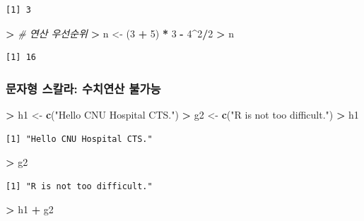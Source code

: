 \documentclass[11pt,a4paper]{book}
\newenvironment{Shaded}{\begin{snugshade}}{\end{snugshade}}
\newcommand{\KeywordTok}[1]{\textcolor[rgb]{0.13,0.29,0.53}{\textbf{#1}}}
\newcommand{\DecValTok}[1]{\textcolor[rgb]{0.00,0.00,0.81}{#1}}
\newcommand{\StringTok}[1]{\textcolor[rgb]{0.31,0.60,0.02}{#1}}
\newcommand{\CommentTok}[1]{\textcolor[rgb]{0.56,0.35,0.01}{\textit{#1}}}
\newcommand{\OperatorTok}[1]{\textcolor[rgb]{0.81,0.36,0.00}{\textbf{#1}}}
\newcommand{\ErrorTok}[1]{\textcolor[rgb]{0.64,0.00,0.00}{\textbf{#1}}}
\newcommand{\NormalTok}[1]{#1}
\theoremstyle{definition}
\theoremstyle{definition}
\theoremstyle{definition}
\theoremstyle{remark}
\begin{document}
\begin{verbatim}
[1] 3
\end{verbatim}

\begin{Shaded}
\begin{Highlighting}[]
\OperatorTok{>}\StringTok{ }\CommentTok{# 연산 우선순위}
\ErrorTok{>}\StringTok{ }\NormalTok{n <-}\StringTok{ }\NormalTok{(}\DecValTok{3} \OperatorTok{+}\StringTok{ }\DecValTok{5}\NormalTok{) }\OperatorTok{*}\StringTok{ }\DecValTok{3} \OperatorTok{-}\StringTok{ }\DecValTok{4}\OperatorTok{^}\DecValTok{2}\OperatorTok{/}\DecValTok{2}
\OperatorTok{>}\StringTok{ }\NormalTok{n}
\end{Highlighting}
\end{Shaded}

\begin{verbatim}
[1] 16
\end{verbatim}

\normalsize

\subsubsection{문자형 스칼라: 수치연산 불가능}\label{---}

\footnotesize

\begin{Shaded}
\begin{Highlighting}[]
\OperatorTok{>}\StringTok{ }\NormalTok{h1 <-}\StringTok{ }\KeywordTok{c}\NormalTok{(}\StringTok{"Hello CNU Hospital CTS."}\NormalTok{)}
\OperatorTok{>}\StringTok{ }\NormalTok{g2 <-}\StringTok{ }\KeywordTok{c}\NormalTok{(}\StringTok{"R is not too difficult."}\NormalTok{)}
\OperatorTok{>}\StringTok{ }\NormalTok{h1}
\end{Highlighting}
\end{Shaded}

\begin{verbatim}
[1] "Hello CNU Hospital CTS."
\end{verbatim}

\begin{Shaded}
\begin{Highlighting}[]
\OperatorTok{>}\StringTok{ }\NormalTok{g2}
\end{Highlighting}
\end{Shaded}

\begin{verbatim}
[1] "R is not too difficult."
\end{verbatim}

\begin{Shaded}
\begin{Highlighting}[]
\OperatorTok{>}\StringTok{ }\NormalTok{h1 }\OperatorTok{+}\StringTok{ }\NormalTok{g2}
\end{Highlighting}
\end{Shaded}
\end{document}
